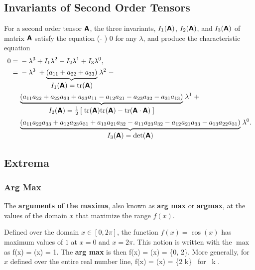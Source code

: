 \subsection{Invariants of Second Order Tensors}
For a second order tensor $\mbox{\sffamily\bfseries A}$, the three invariants, 
$I_1(\mbox{\sffamily\bfseries A})$, 
$I_2(\mbox{\sffamily\bfseries A})$, and 
$I_3(\mbox{\sffamily\bfseries A})$ of matrix
$\mbox{\sffamily\bfseries A}$ satisfy the equation
\be
\det(\tAbold - \lambda \vid)  0
\ee
for any $\lambda$, and produce the characteristic equation
\begin{align}
 0 = & \; - \lambda^3 + I_1 \lambda^2 - I_2 \lambda^1 + I_3 \lambda^0, \\
   = & \; - \lambda^3 \; 
     + 
       \underset{\mbox{\normalsize$I_1(\mbox{\sffamily\bfseries A}) = \mbox{tr} (\mbox{\sffamily\bfseries A})$}}{\underbrace{\left(a_{11} 
       + a_{22} + a_{33} \right)}} \; \lambda^2 \; - \nonumber \\
   &  \; \underset{\mbox{\normalsize$I_2(\mbox{\sffamily\bfseries A}) = \frac{1}{2}\left[ \;
			 \mbox{tr}(\mbox{\sffamily\bfseries A}) \mbox{tr}(\mbox{\sffamily\bfseries A}) - 
	         \mbox{tr}(\mbox{\sffamily\bfseries A} \cdot \mbox{\sffamily\bfseries A})
		      \; \right]$}}
                {\underbrace{\left(a_{11} a_{22} + 
       a_{22} a_{33} + a_{33} a_{11} - 
       a_{12} a_{21} - a_{23} a_{32} - a_{31} a_{13} \right)}} 
	   \; \lambda^1 \; + \nonumber \\
   & \; \underset{\mbox{\normalsize$I_3(\mbox{\sffamily\bfseries A}) = \det (\mbox{\sffamily\bfseries A})$}}{\underbrace{\left(
       a_{11} a_{22} a_{33} 
       + a_{12} a_{23} a_{31} 
       + a_{13} a_{21} a_{32}
       - a_{11} a_{23} a_{32} 
       - a_{12} a_{21} a_{33}
       - a_{13} a_{22} a_{31} 
       \right)}} \; \lambda^0.
\label{eq:invariants_sot}
\end{align}





\subsection{Extrema}

\subsubsection{Arg Max}

The {\bf arguments of the maxima}, also known as 
{\bf arg max} or {\bf argmax}, at the 
values of the domain $x$ that maximize the range $f(x)$.  

\begin{Hexample}{
Defined over the domain $x \in [0, 2\pi]$, 
the function $f(x) = \cos(x) $ has  
maximum values of $1$ at $x=0$ and $x=2\pi$.  This notion is
written with the $\max$ as
\be
{} \; f(x) = 
 \cos(x) = 1.
\ee
The {\bf arg max} is then 
\be
{} \; f(x) = 
 \; \cos(x) = \{0, 2\pi\}.
\ee
More generally, for $x$ defined over the entire real number line,
\be
{} \; f(x) = 
 \; \cos(x) = \{2\pi \; k\} \mbox{ for } k \in \integer.
\ee
}\end{Hexample}
  
